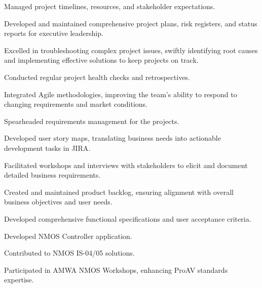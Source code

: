 \documentclass[]{external}
\begin{document}
\begin{paracol}{2}
    \begin{tightemize}
        \item Managed project timelines, resources, and stakeholder expectations.
        \item Developed and maintained comprehensive project plans, risk registers, and status reports for executive leadership.
        \item Excelled in troubleshooting complex project issues, swiftly identifying root causes and implementing effective solutions to keep projects on track.
        \item Conducted regular project health checks and retrospectives.
        \item Integrated Agile methodologies, improving the team's ability to respond to changing requirements and market conditions.
    \end{tightemize}
    \sectionsep

    \begin{tightemize}
        \item Spearheaded requirements management for the projects.
        \item Developed user story maps, translating business needs into actionable development tasks in JIRA.
        \item Facilitated workshops and interviews with stakeholders to elicit and document detailed business requirements.
        \item Created and maintained product backlog, ensuring alignment with overall business objectives and user needs.
        \item Developed comprehensive functional specifications and user acceptance criteria.
    \end{tightemize}
    \sectionsep

    \begin{tightemize}
        \item Developed NMOS Controller application.
        \item Contributed to NMOS IS-04/05 solutions.
        \item Participated in AMWA NMOS Workshops, enhancing ProAV standards expertise.
    \end{tightemize}
    \sectionsep


\end{paracol}
\end{document}
